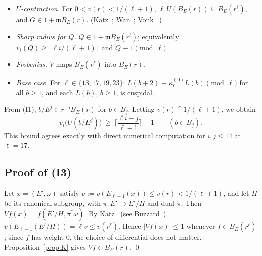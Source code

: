 \documentclass[11pt]{amsart}
\newcommand{\fm}{\mathfrak{m}}
\theoremstyle{plain}
\theoremstyle{definition}
\numberwithin{equation}{section}
\begin{document}
\begin{itemize}
\item[(I1)] \emph{$U$-contraction.} For $0<v(r)<1/(\ell+1)$, $\ell\,U(B_E(r))\subseteq B_E(r^\ell)$, and
  $G\in1+\fm B_E(r)$. (Katz~\cite{Katz1973}; Wan~\cite{Wan1998}; Vonk~\cite[Thm.~B]{Vonk2015}.)
\item[(I2)] \emph{Sharp radius for $Q$.} $Q\in 1+\fm B_E(r^\ell)$; equivalently $v_i(Q)\ge\lceil\ell i/(\ell+1)\rceil$ and $Q\equiv1\pmod\ell$.
\item[(I3)] \emph{Frobenius.} $V$ maps $B_E(r^\ell)$ into $B_E(r)$.
\item[(I4)] \emph{Base case.} For $\ell\in\{13,17,19,23\}$: $L(b+2)\equiv\kappa^{(0)}_\ell L(b)\pmod\ell$ for all $b\ge1$,
  and each $L(b)$, $b\ge1$, is cuspidal.
\end{itemize}

From (I1), $b/E^j\in r^{-j}B_E(r)$ for $b\in B_j$. Letting $v(r)\uparrow1/(\ell+1)$, we obtain
\begin{equation}\tag{UB}\label{eq:UB}
  v_i\big(U(b/E^j)\big)\ \ge\ \Big\lceil\frac{\ell i-j}{\ell+1}\Big\rceil-1\qquad(b\in B_j).
\end{equation}
This bound agrees exactly with direct numerical computation for $i,j\le14$ at $\ell=17$.

\subsection{Proof of (I3)}\label{sec:I3}
Let $x=(E',\omega)$ satisfy $v:=v(E_{\ell-1}(x))\le v(r)<1/(\ell+1)$, and let $H$ be its canonical subgroup, with
$\pi:E'\to E'/H$ and dual $\check\pi$. Then $Vf(x)=f(E'/H,\check\pi^*\omega)$. By Katz~\cite[3.10.7]{Katz1973}
(see Buzzard~\cite[Thm.~3.3(ii)]{Buzzard2003}), $v(E_{\ell-1}(E'/H))=\ell v\le v(r^\ell)$. Hence
$|Vf(x)|\le1$ whenever $f\in B_E(r^\ell)$; since $f$ has weight $0$, the choice of differential does not matter.
Proposition~\ref{prop:K} gives $Vf\in B_E(r)$. \qed

\end{document}
